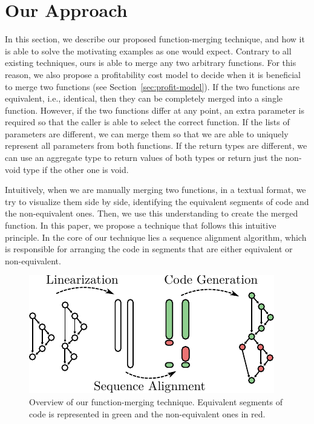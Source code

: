 \section{Our Approach} \label{sec:fm}

In this section, we describe our proposed function-merging technique, and how it is able to solve the motivating examples as one would expect. Contrary to all existing techniques, ours is able to merge any two arbitrary functions.
For this reason, we also propose a profitability cost model to decide when it is beneficial to merge two functions (see Section~\ref{sec:profit-model}).
If the two functions are equivalent, i.e., identical, then they can be completely merged into a single function.
However, if the two functions differ at any point, an extra parameter is required so that the caller is able to select the correct function.
If the lists of parameters are different, we can merge them so that we are able to uniquely represent all parameters from both functions. If the return types are
different, we can use an aggregate type to return values of both types or return just the non-void type if the other one is void.

Intuitively, when we are manually merging two functions, in a textual format, we try to visualize them side by side, identifying the equivalent segments of code and the non-equivalent ones. Then, we use this understanding to create the merged function.
In this paper, we propose a technique that follows this intuitive principle.
In the core of our technique lies a sequence alignment algorithm, which is responsible for arranging the code in segments that are either equivalent or non-equivalent.

\begin{figure}[t!]
  \centering
  \includegraphics[width=0.85\linewidth]{figs/func-merge-overview.pdf}
  \caption{Overview of our function-merging technique.
           Equivalent segments of code is represented in green and the non-equivalent ones in red.}
  \label{fig:func-merge-overview}
\end{figure}

